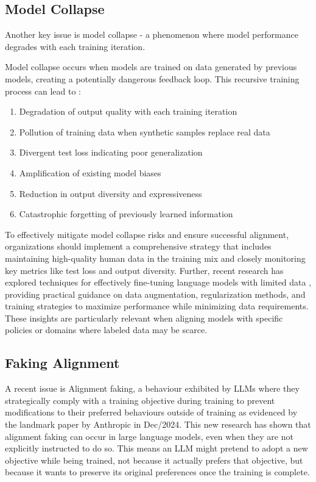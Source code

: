 \subsection{Model Collapse}

Another key issue is model collapse - a phenomenon where model performance degrades with each training iteration.

Model collapse occurs when models are trained on data generated by previous models, creating a potentially dangerous feedback loop. This recursive training process can lead to :

\begin{enumerate}
\item Degradation of output quality with each training iteration
\item Pollution of training data when synthetic samples replace real data  
\item Divergent test loss indicating poor generalization
\item Amplification of existing model biases
\item Reduction in output diversity and expressiveness
\item Catastrophic forgetting of previously learned information
\end{enumerate}

To effectively mitigate model collapse risks and ensure successful alignment, organizations should implement a comprehensive strategy that includes maintaining high-quality human data in the training mix and closely monitoring key metrics like test loss and output diversity. Further, recent research has explored techniques for effectively fine-tuning language models with limited data , providing practical guidance on data augmentation, regularization methods, and training strategies to maximize performance while minimizing data requirements. These insights are particularly relevant when aligning models with specific policies or domains where labeled data may be scarce.

\subsection{Faking Alignment}

A recent issue is Alignment faking, a behaviour exhibited by LLMs where they strategically comply with a training objective during training to prevent modifications to their preferred behaviours outside of training as evidenced by the landmark paper by Anthropic  in Dec/2024. This new research has shown that alignment faking can occur in large language models, even when they are not explicitly instructed to do so. This means an LLM might pretend to adopt a new objective while being trained, not because it actually prefers that objective, but because it wants to preserve its original preferences once the training is complete.

